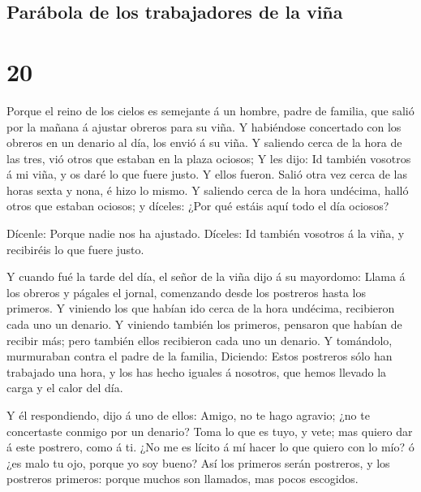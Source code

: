 \hypertarget{paruxe1bola-de-los-trabajadores-de-la-viuxf1a}{%
\subsection{Parábola de los trabajadores de la
viña}\label{paruxe1bola-de-los-trabajadores-de-la-viuxf1a}}

\hypertarget{section-19}{%
\section{20}\label{section-19}}

 Porque el reino de los cielos es semejante á un hombre,
padre de familia, que salió por la mañana á ajustar obreros para su
viña.  Y habiéndose concertado con los obreros en un
denario al día, los envió á su viña.  Y saliendo cerca de
la hora de las tres, vió otros que estaban en la plaza ociosos;
 Y les dijo: Id también vosotros á mi viña, y os daré lo
que fuere justo. Y ellos fueron.  Salió otra vez cerca de
las horas sexta y nona, é hizo lo mismo.  Y saliendo cerca
de la hora undécima, halló otros que estaban ociosos; y díceles: ¿Por
qué estáis aquí todo el día ociosos?

 Dícenle: Porque nadie nos ha ajustado. Díceles: Id
también vosotros á la viña, y recibiréis lo que fuere justo.

 Y cuando fué la tarde del día, el señor de la viña dijo á
su mayordomo: Llama á los obreros y págales el jornal, comenzando desde
los postreros hasta los primeros.  Y viniendo los que
habían ido cerca de la hora undécima, recibieron cada uno un denario.
 Y viniendo también los primeros, pensaron que habían de
recibir más; pero también ellos recibieron cada uno un denario.
 Y tomándolo, murmuraban contra el padre de la familia,
 Diciendo: Estos postreros sólo han trabajado una hora, y
los has hecho iguales á nosotros, que hemos llevado la carga y el calor
del día.

 Y él respondiendo, dijo á uno de ellos: Amigo, no te
hago agravio; ¿no te concertaste conmigo por un denario? 
Toma lo que es tuyo, y vete; mas quiero dar á este postrero, como á ti.
 ¿No me es lícito á mí hacer lo que quiero con lo mío? ó
¿es malo tu ojo, porque yo soy bueno?  Así los primeros
serán postreros, y los postreros primeros: porque muchos son llamados,
mas pocos escogidos.

